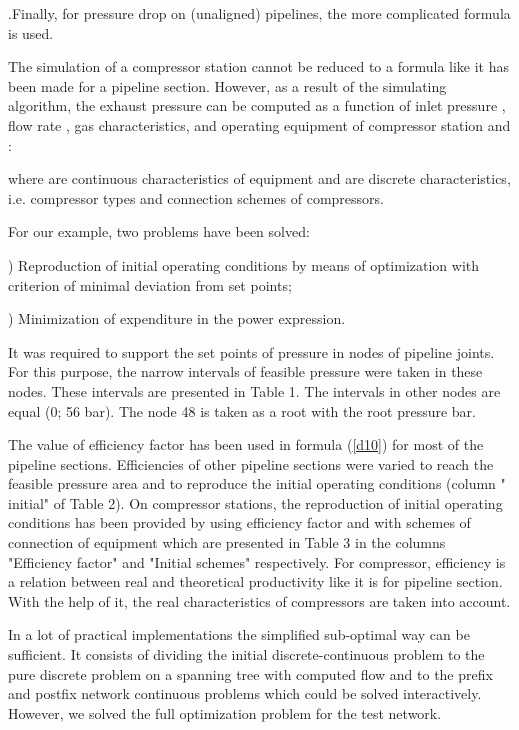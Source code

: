 \documentclass{article}
\begin{document}
.Finally, for pressure drop on (unaligned) pipelines, the more complicated
formula \cite{11 Simone-88} is used.

The simulation of a compressor station cannot be reduced to a formula like
it has been made for a pipeline section. However, as a result of the
simulating algorithm, the exhaust pressure  can be computed as a
function of inlet pressure  , flow rate  , gas
characteristics, and operating equipment of compressor station  and  :

where  are continuous characteristics of equipment and  are
discrete characteristics, i.e. compressor types and connection schemes of
compressors.

For our example, two problems have been solved:

) Reproduction of initial operating conditions by means of
optimization with criterion of minimal deviation from set points;

) Minimization of expenditure in the power expression.

It was required to support the set points of pressure in nodes of pipeline
joints. For this purpose, the narrow intervals of feasible pressure were
taken in these nodes. These intervals are presented in Table 1. The
intervals in other nodes are equal (0; 56 bar). The node 48 is taken as a
root with the root pressure  bar.

The value  of efficiency factor has been used in formula (\ref{d10})
for most of the pipeline sections. Efficiencies of other pipeline sections
were varied to reach the feasible pressure area and to reproduce the initial
operating conditions (column " initial" of Table 2). On compressor
stations, the reproduction of initial operating conditions has been provided
by using efficiency factor  and with schemes of connection of equipment
which are presented in Table 3 in the columns "Efficiency factor" and
"Initial schemes" respectively. For compressor, efficiency  is a relation
between real and theoretical productivity like it is for pipeline section.
With the help of it, the real characteristics of compressors are taken into
account.

In a lot of practical implementations the simplified sub-optimal way can be
sufficient. It consists of dividing the initial discrete-continuous problem
to the pure discrete problem on a spanning tree with computed flow and to
the prefix and postfix network continuous problems which could be solved
interactively. However, we solved the full optimization problem for the test
network.
\end{document}
